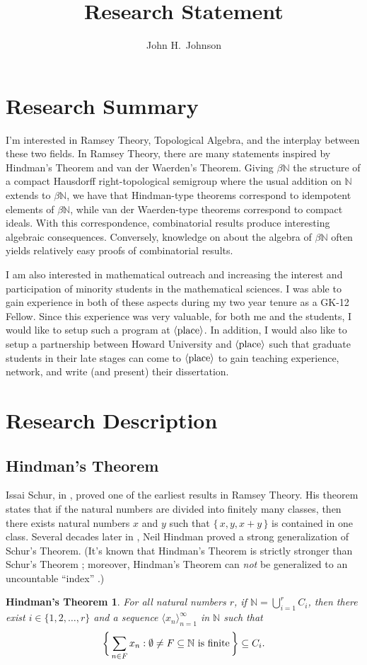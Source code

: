 \documentclass[12pt]{article}
\title{Research Statement}
\author{John H.~Johnson}
\theoremstyle{plain}
\newtheorem{fst}[thm]{Hindman's Theorem}
\theoremstyle{definition}
\newcommand{\bbN}{\mathbb{N}}
\newcommand{\la}{\langle}
\newcommand{\ra}{\rangle}
\begin{document}
\maketitle
\tableofcontents
\section{Research Summary}
I'm interested in Ramsey Theory, Topological Algebra, and the
interplay between these two fields.
In Ramsey Theory, there are many statements inspired by Hindman's
Theorem and van der Waerden's Theorem.
Giving $\beta\bbN$ the structure of a compact Hausdorff
right-topological semigroup where the usual addition on $\bbN$ extends
to $\beta\bbN$, we have that Hindman-type theorems correspond to
idempotent elements of $\beta\bbN$, while van der Waerden-type
theorems correspond to compact ideals.
With this correspondence, combinatorial results produce interesting
algebraic consequences.
Conversely, knowledge on about the algebra of $\beta\bbN$ often yields
relatively easy proofs of combinatorial results. 

I am also interested in mathematical outreach and increasing the
interest and participation of minority students in the mathematical
sciences. 
I was able to gain experience in both of these aspects during my two
year tenure as a GK-12 Fellow.
Since this experience was very valuable, for both me and the students,
I would like to setup such a program at $\la\hbox{place}\ra$.
In addition, I would also like to setup a partnership between Howard
University and $\la\hbox{place}\ra$ such that graduate students in
their late stages can come to $\la\hbox{place}\ra$ to gain teaching
experience, network, and write (and present) their dissertation. 

\section{Research Description}
\subsection{Hindman's Theorem}
Issai Schur, in \cite{Schur:1916fk}, proved one of the earliest
results in Ramsey Theory.
His theorem states that if the natural numbers are divided into
finitely many classes, then there exists natural numbers $x$ and $y$
such that $\{\,x, y, x+y\,\}$ is contained in one class.
Several decades later in \cite{Hindman:1974ys}, Neil Hindman proved a
strong generalization of Schur's Theorem.
(It's known that Hindman's Theorem is strictly stronger than Schur's
Theorem \cite[Theorems 16.28 and 16.29]{Hindman:1998fk}; moreover,
Hindman's Theorem can \textsl{not} be generalized to an uncountable
``index'' \cite{Milliken:1978fk}.)
\begin{fst}
  For all natural numbers $r$, if \/ $\bbN = \bigcup_{i=1}^r C_i$,
  then there exist $i \in \{1, 2, \ldots, r\}$ and a sequence $\la x_n
  \ra_{n=1}^\infty$ in $\bbN$ such that
  \[
    \biggl\{\, \sum_{n \in F} x_n : \hbox{$\emptyset \ne F \subseteq
      \bbN$ is finite} \,\biggr\} \subseteq C_i.
  \]
\end{fst}
\end{document}
